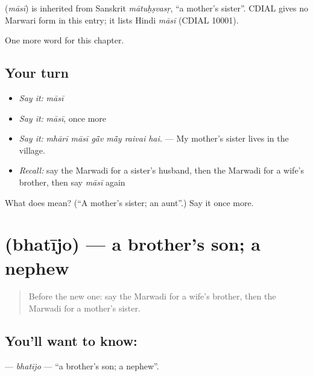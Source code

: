 \begin{cousinweb}
\textbf{} (\emph{māsī}) is inherited from Sanskrit \emph{mātuḥṣvasṛ}, \textquotedblleft{}a mother's sister\textquotedblright{}. CDIAL gives no Marwari form in this entry; it lists Hindi \emph{māsī} (CDIAL 10001).
\end{cousinweb}

\begin{grammarlens}[title={What you've built}]
One more word for this chapter.
\end{grammarlens}

\subsection*{Your turn}
\begin{itemize}
\raggedright
  \item \emph{Say it:} \emph{māsī}
  \item \emph{Say it:} \emph{māsī}, once more
  \item \emph{Say it:} \emph{mhārī māsī gā̃v mā̃y raivai hai.} — My mother's sister lives in the village.
  \item \emph{Recall:} say the Marwadi for a sister's husband, then the Marwadi for a wife's brother, then say \emph{māsī} again
\end{itemize}

\begin{tcolorbox}[breakable,colback=teal!4,colframe=teal!35!black,title={Before you move on}]
What does  mean? (\textquotedblleft{}A mother's sister; an aunt\textquotedblright{}.) Say it once more.
\end{tcolorbox}
\section[\texorpdfstring{\mw{भतीजो} (bhatījo)}{भतीजो (bhatījo)}]{ (bhatījo) — a brother's son; a nephew}

\label{lesson:MW-C261-bhatijo}



\begin{quote}
Before the new one: say the Marwadi for a wife's brother, then the Marwadi for a mother's sister.
\end{quote}

\subsection*{You'll want to know: }
\textbf{} — \emph{bhatījo} — \textquotedblleft{}a brother's son; a nephew\textquotedblright{}.

